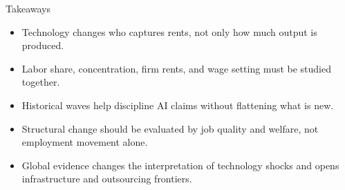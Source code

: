 \documentclass[aspectratio=169,11pt]{beamer}
\begin{document}
\begin{frame}{Takeaways}
\begin{itemize}
    \item Technology changes who captures rents, not only how much output is produced.
    \item Labor share, concentration, firm rents, and wage setting must be studied together.
    \item Historical waves help discipline AI claims without flattening what is new.
    \item Structural change should be evaluated by job quality and welfare, not employment movement alone.
    \item Global evidence changes the interpretation of technology shocks and opens infrastructure and outsourcing frontiers.
\end{itemize}
\end{frame}
\end{document}

